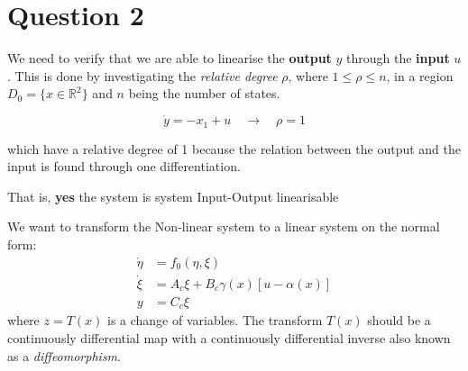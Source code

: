 \chapter{Question 2}

We need to verify that we are able to linearise the \textbf{output} $y$ through the \textbf{input} $u$. This is done by
investigating the \textit{relative degree} $\rho$, where $1 \leq \rho \leq n$, in a region $D_0 = \{x \in \mathbb{R}^2\}$ and $n$ being
the number of states. 

\begin{equation}
        \dot{y} = -x_1 + u \quad \rightarrow \quad \rho = 1
\end{equation}

which have a relative degree of 1 because the relation between the output and the input is found through one
differentiation.

That is, \textbf{yes} the system is system Input-Output linearisable

We want to transform the Non-linear system to a linear system on the normal form:
\begin{equation}
        \begin{split}
                \dot{\eta} &= f_0(\eta,\xi) \\
                \dot{\xi} &= A_c \xi + B_c \gamma(x) \left[u - \alpha(x)\right] \\
                y &= C_c \xi
        \end{split}
\end{equation}
where $z = T(x)$ is a change of variables. The transform $T(x)$ should be a continuously differential map with a
continuously differential inverse also known as a \textit{diffeomorphism}. 


